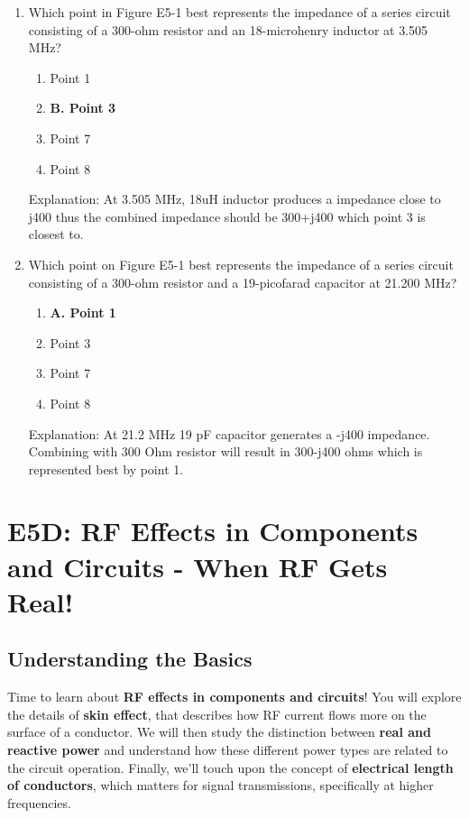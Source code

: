 \begin{enumerate}
     \item Which point in Figure E5-1 best represents the impedance of a series circuit consisting of a 300-ohm resistor and an 18-microhenry inductor at 3.505 MHz?
       \begin{enumerate}
       \item  Point 1
        \item \textbf{B. Point 3}
         \item  Point 7
        \item  Point 8
        \end{enumerate}
        \textcolor{myred}{Explanation:}
    At 3.505 MHz, 18uH inductor produces a impedance close to j400 thus the combined impedance should be 300+j400 which point 3 is closest to.
        
      \item Which point on Figure E5-1 best represents the impedance of a series circuit consisting of a 300-ohm resistor and a 19-picofarad capacitor at 21.200 MHz?
       \begin{enumerate}
    \item \textbf{A. Point 1}
       \item  Point 3
       \item  Point 7
       \item  Point 8
        \end{enumerate}
   \textcolor{myred}{Explanation:}
    At 21.2 MHz 19 pF capacitor generates a -j400 impedance. Combining with 300 Ohm resistor will result in 300-j400 ohms which is represented best by point 1.
\end{enumerate}

\section{E5D: RF Effects in Components and Circuits -  When RF Gets Real!}
\subsection*{Understanding the Basics}
Time to learn about \textcolor{myblue}{\textbf{RF effects in components and circuits}}! You will explore the details of \textcolor{myblue}{\textbf{skin effect}}, that describes how RF current flows more on the surface of a conductor. We will then study the distinction between  \textcolor{myblue}{\textbf{real and reactive power}} and understand how these different power types are related to the circuit operation. Finally, we'll touch upon the concept of  \textcolor{myblue}{\textbf{electrical length of conductors}}, which matters for signal transmissions, specifically at higher frequencies.

